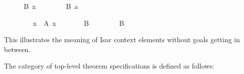 \begin{isabellebody}
\begin{minipage}[t]{0.45\textwidth}
\ \ \ \ \isamarkupfalse%
\ {}B\ x{}%
\endisatagproof
{\isafoldproof}%
%
\isadelimproof
%
\endisadelimproof
%
\isadelimnoproof
\ %
\endisadelimnoproof
%
\isatagnoproof
{}\isamarkupfalse%
%
\endisatagnoproof
{\isafoldnoproof}%
%
\isadelimnoproof
\isanewline
%
\endisadelimnoproof
%
\isadelimproof
\ \ %
\endisadelimproof
%
\isatagproof
{}\isamarkupfalse%
\isanewline
\ \ \isamarkupfalse%
\ {}B\ a{}%
\end{minipage}\quad\begin{minipage}[t]{0.45\textwidth}
\ \ \isamarkupfalse%
\isanewline
\ \ \ \ \isamarkupfalse%
\ x\ \ {}A\ x{}%
\endisatagproof
{\isafoldproof}%
%
\isadelimproof
%
\endisadelimproof
%
\isadelimnoproof
\ %
\endisadelimnoproof
%
\isatagnoproof
{}\isamarkupfalse%
%
\endisatagnoproof
{\isafoldnoproof}%
%
\isadelimnoproof
\isanewline
%
\endisadelimnoproof
%
\isadelimproof
\ \ \ \ %
\endisadelimproof
%
\isatagproof
{}\isamarkupfalse%
\ B%
\endisatagproof
{\isafoldproof}%
%
\isadelimproof
%
\endisadelimproof
%
\isadelimnoproof
\ %
\endisadelimnoproof
%
\isatagnoproof
{}\isamarkupfalse%
%
\endisatagnoproof
{\isafoldnoproof}%
%
\isadelimnoproof
\isanewline
%
\endisadelimnoproof
%
\isadelimproof
\ \ %
\endisadelimproof
%
\isatagproof
{}\isamarkupfalse%
\isanewline
\ \ \isamarkupfalse%
\ {}B{}%
\end{minipage}
%
\endisatagproof
{\isafoldproof}%
%
\isadelimproof
%
\endisadelimproof
%
\begin{isamarkuptext}%
\bigskip\noindent This illustrates the meaning of Isar context
  elements without goals getting in between.%
\end{isamarkuptext}%
\isamarkuptrue%
%
\isamarkuptrue%
%
\begin{isamarkuptext}%
The category  of top-level theorem specifications
  is defined as follows:


\end{isamarkuptext}
\end{isabellebody}
